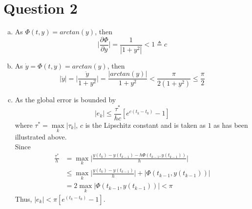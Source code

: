 \documentclass[paper=a4, fontsize=11pt]{scrartcl} %
\numberwithin{equation}{section} %
\numberwithin{figure}{section} %
\numberwithin{table}{section} %
\begin{document}
\section{Question 2}
	\begin{enumerate}[(a)]
		\item 
			As $\Phi(t, y) = arctan(y)$, then
			\begin{equation}
				\Bigg| \frac{\partial \Phi}{\partial y} \Bigg| = \frac{1}{|1+y^2|} < 1 \triangleq c
			\end{equation}
		\item 
			As $\dot{y} = \Phi(t, y) = arctan(y)$, then
			\begin{equation}
				|\ddot{y}| = \Bigg| \frac{\dot{y}}{1+y^2} \Bigg| = \frac{|arctan(y)|}{1+y^2} < \frac{\pi}{2(1+y^2)} \leq \frac{\pi}{2} 
			\end{equation}
		\item 
			As the global error is bounded by
			\begin{equation}
				|e_k| \leq \frac{\tau^*}{hc}[e^{c(t_k - t_0)} - 1]
			\end{equation}
			where $\tau^* = \max\limits_{k}|\tau_k|$, $c$ is the Lipschitz constant and is taken as $1$ as has been illustrated above.\\
			Since 
			\begin{equation}
				\begin{aligned}
					\frac{\tau^*}{h} & = \max\limits_{k}\Bigg|\frac{y(t_k) - y(t_{k-1}) - h\Phi(t_{k-1}, y(t_{k-1}))}{h}\Bigg|\\
									 & \leq \max\limits_{k}\Bigg| \frac{y(t_k) - y(t_{k-1})}{h}\Bigg| + |\Phi(t_{k-1}, y(t_{k-1}))|\\
									 & = 2 \max\limits_{k} |\Phi(t_{k-1}, y(t_{k-1}))| < \pi
				\end{aligned}
			\end{equation}
			Thus, $|e_k| < \pi[e^{(t_k - t_0)}-1]$.
	\end{enumerate}
\end{document}

